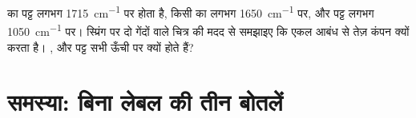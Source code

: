 \begin{exercise}[$\star\star\star$]\label{exo:g11:infrared:15}
 का  पट्ट लगभग \qty{1715}{cm^{-1}} पर होता है, किसी
 का लगभग \qty{1650}{cm^{-1}} पर, और  पट्ट लगभग
\qty{1050}{cm^{-1}} पर। स्प्रिंग पर दो गेंदों वाले चित्र की मदद से समझाइए
कि   एकल आबंध  से तेज़ कंपन क्यों करता है।
,  और  पट्ट सभी ऊँची  पर क्यों होते हैं?
\end{exercise}

\section{समस्या: बिना लेबल की तीन बोतलें}

